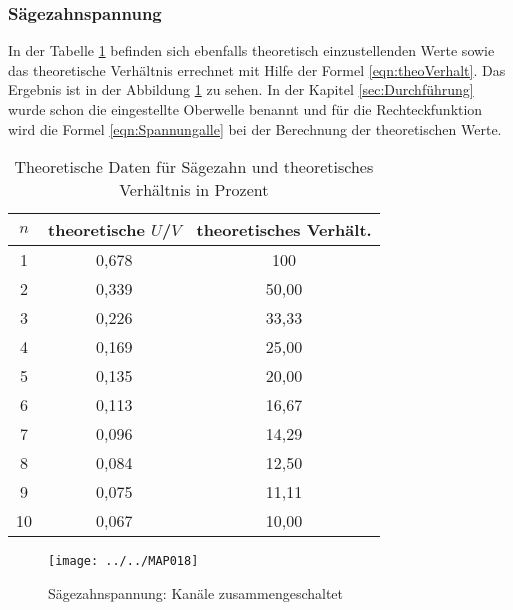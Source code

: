 \subsubsection{Sägezahnspannung}
In der Tabelle \ref{tab:Sägezahnynthese} befinden sich ebenfalls theoretisch einzustellenden Werte sowie das theoretische Verhältnis errechnet mit Hilfe der Formel \ref{eqn:theoVerhalt}. Das Ergebnis ist in der Abbildung \ref{fig:map018} zu sehen. In der Kapitel \ref{sec:Durchführung} wurde schon die eingestellte Oberwelle benannt und für die Rechteckfunktion wird die Formel \ref{eqn:Spannungalle} bei der Berechnung der theoretischen Werte.
\begin{table}[htbp]
	\centering
	\caption{Theoretische Daten für Sägezahn und theoretisches Verhältnis in Prozent}
	\label{tab:Sägezahnynthese}
	\begin{tabular}{c c c}
		\toprule
		$n$ & theoretische $U$/$V$ & theoretisches Verhält. \\
		\midrule
		1 & 0,678 & 100 \\
		2 & 0,339 & 50,00 \\
		3 & 0,226 & 33,33 \\ 
		4 & 0,169 & 25,00 \\
		5 & 0,135 & 20,00 \\
		6 & 0,113 & 16,67 \\
		7 & 0,096 & 14,29 \\
		8 & 0,084 & 12,50 \\
		9 & 0,075 & 11,11 \\
		10 & 0,067 & 10,00 \\
		\bottomrule
	\end{tabular}
\end{table}
\FloatBarrier
\begin{figure}[htb]
	\centering
	\texttt{[image: ../../MAP018]}
	\caption{Sägezahnspannung: Kanäle zusammengeschaltet}
	\label{fig:map018}
\end{figure}

